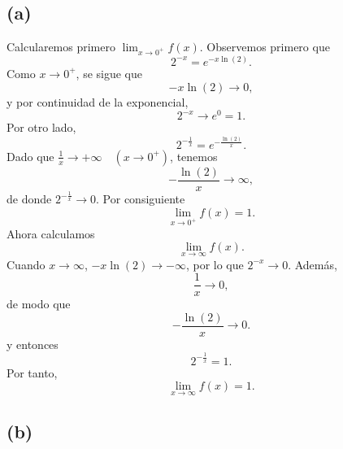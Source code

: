 \documentclass[12pt,a4paper]{article}
\begin{document}
    \begin{solucion}
        \subsection*{(a)}
        Calcularemos primero $\lim_{x\to0^{+}}f(x)$. Observemos primero que
        \begin{equation*}
            2^{-x}=e^{-x\ln(2)}.
        \end{equation*}
        Como $x\to0^{+}$, se sigue que
        \begin{equation*}
            -x\ln(2)\to0,
        \end{equation*}
        y por continuidad de la exponencial,
        \begin{equation*}
            2^{-x}\to e^{0}=1.
        \end{equation*}
        Por otro lado,
        \begin{equation*}
            2^{-\frac{1}{x}}=e^{-\frac{\ln(2)}{x}}.
        \end{equation*}
        Dado que $\frac{1}{x}\to+\infty\quad(x\to0^{+})$, tenemos
        \begin{equation*}
            -\frac{\ln(2)}{x}\to\infty,
        \end{equation*}
        de donde $2^{-\frac{1}{x}}\to0$. Por consiguiente
        \begin{equation*}
            \lim_{x\to0^{+}}f(x)=1.
        \end{equation*}
        Ahora calculamos
        \begin{equation*}
            \lim_{x\to\infty}f(x).
        \end{equation*}
        Cuando $x\to\infty$, $-x\ln(2)\to-\infty$, por lo que $2^{-x}\to0$. Además,
        \begin{equation*}
            \frac{1}{x}\to0,
        \end{equation*}
        de modo que
        \begin{equation*}
            -\frac{\ln(2)}{x}\to0.
        \end{equation*}
        y entonces
        \begin{equation*}
            2^{-\frac{1}{x}}=1.
        \end{equation*}
        Por tanto,
        \begin{equation*}
            \lim_{x\to\infty}f(x)=1.
        \end{equation*}

        \subsection*{(b)}


\end{solucion}
\end{document}
